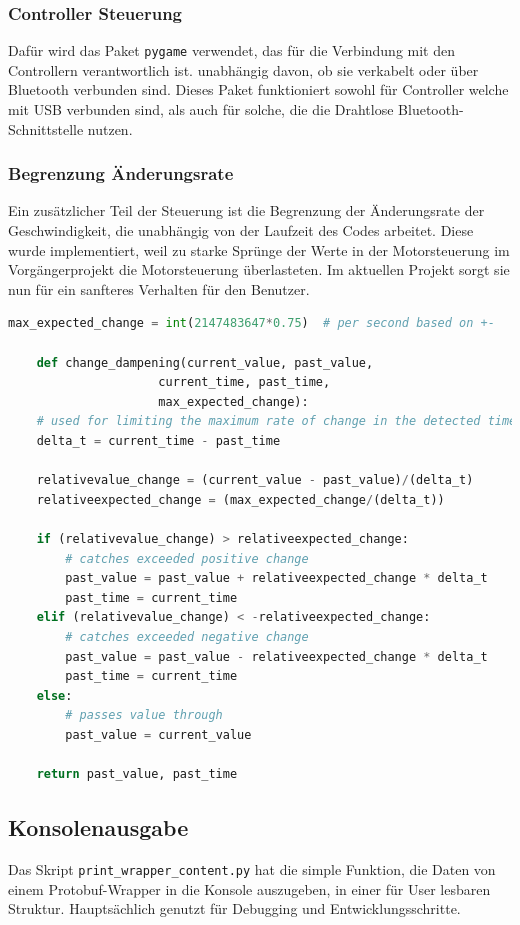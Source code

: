\subsubsection{Controller Steuerung}
Dafür wird das Paket \texttt{pygame} verwendet,
das für die Verbindung mit den Controllern verantwortlich ist.
unabhängig davon, ob sie verkabelt oder über Bluetooth verbunden sind.
%
Dieses Paket funktioniert sowohl für Controller welche mit USB verbunden sind,
als auch für solche, die die Drahtlose Bluetooth-Schnittstelle nutzen.

\subsubsection{Begrenzung Änderungsrate}
Ein zusätzlicher Teil der Steuerung ist die Begrenzung der Änderungsrate der Geschwindigkeit, 
die unabhängig von der Laufzeit des Codes arbeitet.
% 
Diese wurde implementiert, weil zu starke Sprünge der Werte in der Motorsteuerung 
im Vorgängerprojekt die Motorsteuerung überlasteten.
% 
Im aktuellen Projekt sorgt sie nun für ein sanfteres Verhalten für den Benutzer.
\begin{lstlisting}[language=python, gobble=4]
    max_expected_change = int(2147483647*0.75)  # per second based on +-

    def change_dampening(current_value, past_value,
                     current_time, past_time,
                     max_expected_change):
    # used for limiting the maximum rate of change in the detected time window
    delta_t = current_time - past_time

    relativevalue_change = (current_value - past_value)/(delta_t)
    relativeexpected_change = (max_expected_change/(delta_t))

    if (relativevalue_change) > relativeexpected_change:
        # catches exceeded positive change
        past_value = past_value + relativeexpected_change * delta_t
        past_time = current_time
    elif (relativevalue_change) < -relativeexpected_change:
        # catches exceeded negative change
        past_value = past_value - relativeexpected_change * delta_t
        past_time = current_time
    else:
        # passes value through
        past_value = current_value

    return past_value, past_time
\end{lstlisting}

\subsection{Konsolenausgabe}
Das Skript \texttt{print\_wrapper\_content.py} hat die simple Funktion,
die Daten von einem Protobuf-Wrapper in die Konsole auszugeben,
in einer für User lesbaren Struktur.
%
Hauptsächlich genutzt für Debugging und Entwicklungsschritte.

